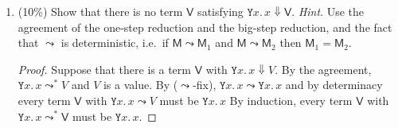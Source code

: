 \documentclass{article}
\newcommand{\sem}[1]{[\![#1]\!]}
\begin{document}
\begin{enumerate}
\begin{enumerate}
\begin{proof}[Answer]
\begin{align*}
            \Lambda (\Lambda \pi_2)
        \end{align*}
        where $\pi_2 : 1 \times D_\sigma \times D_{\sigma_1} \times
        D_{\sigma_2}$ maps $(*, d, d_1, d_2) \in 1 \times D_\sigma \times
        D_{\sigma_1} \times D_{\sigma_2}$ to~$d_1$. 
      \end{proof}
      \item $x : \mathtt{nat}, y : \sigma, z : \sigma \vdash
        \mathtt{ifz}(x; y; m.\, z) : \sigma$
        \begin{proof}[Answer]
          For every $(*, d_1, d_2, d_3) \in 1 \times D_{\mathtt{nat}} \times D_\sigma
          \times D_\sigma$, we have
          \begin{align*}
            &\sem{x : \mathtt{nat}, y : \sigma, z : \sigma \vdash \mathtt{ifz}(x; y;
            m.\, z) : \sigma}\;(*, d_1, d_2, d_3) \\
          ={} & \mathit{ifz}(d_1, d_2, \mathit{const}_{d_3})
          \end{align*}
          or equivalently 
          \[
            \sem{x : \mathtt{nat}, y : \sigma, z : \sigma \vdash \mathtt{ifz}(x; y;
            m.\, z) : \sigma}\;(*, d_1, d_2, d_3) =
          \begin{cases}
            \bot & \text{if } d_1 = \bot \\
            d_2 & \text{if } d_1 = 0 \\
            d_3 & \text{if } d_1 > 0
          \end{cases}
          \]
        \end{proof}
    \end{enumerate}
  \item (10\%) Show that there is no term $\mathsf{V}$ satisfying
    $\mathtt{Y} x.\,x\Downarrow \mathsf{V}$.
    \textit{Hint}. Use the agreement of the one-step reduction and the big-step
    reduction, and the fact that $\leadsto$ is deterministic, i.e.\ 
    if $\mathsf{M} \leadsto \mathsf{M}_1$ and $\mathsf{M} \leadsto
    \mathsf{M}_2$ then $\mathsf{M}_1 = \mathsf{M}_2$. 
        \begin{proof}
          Suppose that there is a term $\mathsf{V}$ with $\mathtt{Y} x.\,
          x\Downarrow V$. By the agreement, $\mathtt{Y} x.\, x \leadsto^* V$
          and $V$ is a value.  By ($\leadsto$-fix),
          $\mathtt{Y} x.\,x\leadsto \mathtt{Y} x.\, x$
          and by determinacy every term $\mathsf{V}$ with $\mathtt{Y} x.\, x \leadsto V$ 
          must be $\mathtt{Y} x.\,x$ 
          By induction, every term $\mathsf{V}$ with $\mathtt{Y} x.\, x
          \leadsto^*\mathsf{V}$ must be $\mathtt{Y} x.\, x$. 


\end{proof}
\end{enumerate}
\end{document}
